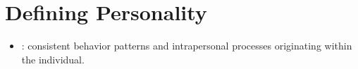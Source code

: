 \section{Defining Personality}
\begin{itemize}
    \item {}: consistent behavior patterns and intrapersonal processes originating within the individual.
\end{itemize}
